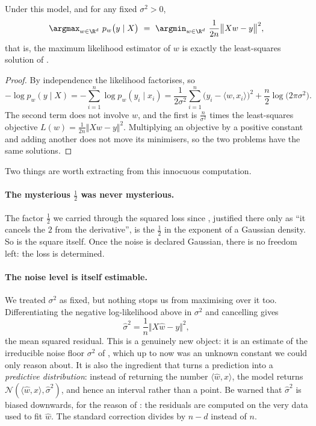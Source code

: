 \begin{prop}
\label{prop:mle-ls}
Under this model, and for any fixed $\sigma^2 > 0$,
\[
\argmax_{w \in \R^d} \ p_w\big( y \mid X \big)
\ = \ \argmin_{w \in \R^d} \ \frac{1}{2n} \big\Vert X w - y \big\Vert^2 ,
\]
that is, the maximum likelihood estimator of $w$ is exactly the least-squares solution
of .
\end{prop}

\begin{proof}
By independence the likelihood factorises, so
\[
- \log p_w(y \mid X)
= - \sum_{i=1}^n \log p_w(y_i \mid x_i)
= \frac{1}{2\sigma^2} \sum_{i=1}^n \big( y_i - \langle w, x_i\rangle \big)^2
+ \frac{n}{2} \log\big( 2\pi\sigma^2 \big) .
\]
The second term does not involve $w$, and the first is $\tfrac{n}{\sigma^2}$ times the
least-squares objective $L(w) = \tfrac{1}{2n}\Vert Xw - y\Vert^2$. Multiplying an
objective by a positive constant and adding another does not move its minimisers, so
the two problems have the same solutions.
\end{proof}

Two things are worth extracting from this innocuous computation.

\paragraph{The mysterious $\tfrac12$ was never mysterious.}
The factor $\tfrac12$ we carried through the squared loss since ,
justified there only as ``it cancels the $2$ from the derivative'', is the $\tfrac12$
in the exponent of a Gaussian density. So is the square itself. Once the noise is
declared Gaussian, there is no freedom left: the loss is determined.

\paragraph{The noise level is itself estimable.}
We treated $\sigma^2$ as fixed, but nothing stops us from maximising over it too.
Differentiating the negative log-likelihood above in $\sigma^2$ and cancelling gives
\[
\hat\sigma^2 = \frac{1}{n} \big\Vert X \hat w - y \big\Vert^2 ,
\]
the mean squared residual. This is a genuinely new object: it is an estimate of the
irreducible noise floor $\sigma^2$ of , which up to now was an
unknown constant we could only reason about. It is also the ingredient that turns a
prediction into a \emph{predictive distribution}: instead of returning the number
$\langle \hat w, x\rangle$, the model returns $\mathcal{N}(\langle \hat w, x\rangle,
\hat\sigma^2)$, and hence an interval rather than a point. Be warned that $\hat\sigma^2$
is biased downwards, for the reason of : the residuals are computed on
the very data used to fit $\hat w$. The standard correction divides by $n - d$ instead
of $n$.

